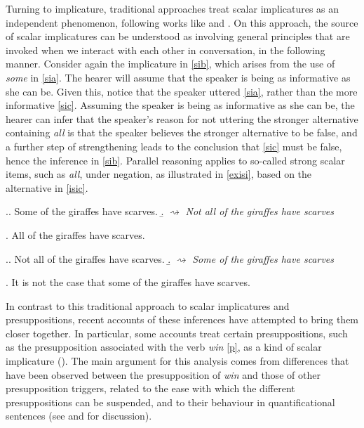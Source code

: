 \documentclass[12pt, letterpaper]{article}
\begin{document}
Turning to implicature, traditional approaches treat scalar implicatures as an independent phenomenon, following works like \cite{Grice:1975} and \cite*{Horn:1972}. On this approach, the source of scalar implicatures can be understood as involving general principles that are invoked when we interact with each other in conversation, in the following manner. Consider again the implicature in \ref{sib}, which arises from the use of \textit{some} in \ref{sia}. The hearer will assume that the speaker is being as informative as she can be. Given this, notice that the speaker uttered \ref{sia}, rather than the more informative \ref{sic}. Assuming the speaker is being as informative as she can be, the hearer can infer that the speaker's reason for not uttering the stronger alternative containing \textit{all} is that the speaker believes the stronger alternative to be false, and a further step of strengthening leads to the conclusion that \ref{sic} must be false, hence the inference in \ref{sib}. Parallel reasoning applies to so-called strong scalar items, such as \textit{all}, under negation, as illustrated in \ref{exisi}, based on the alternative in \ref{isic}.

\ex.\label{exsi}\a. \label{sia} Some of the giraffes have scarves.  
\b. \label{sib} $\rightsquigarrow$ \textit{Not all of the giraffes have scarves}

\ex. \label{sic} All of the giraffes have scarves.

\ex.\label{exisi}\a. \label{isia} Not all of the giraffes have scarves.  
\b. \label{isib} $\rightsquigarrow$ \textit{Some of the giraffes have scarves}

\ex. \label{isic} It is not the case that some of the giraffes have scarves.

In contrast to this traditional approach to scalar implicatures and presuppositions, recent accounts of these inferences have attempted to bring them closer together. In particular, some accounts treat certain presuppositions, such as the presupposition associated with the verb \textit{win} \ref{p}, as a kind of scalar implicature (\citealt{Simons:2001, Abusch:2002, Abusch:2009, Chemla:2009, Romoli:2012c, Romoli:2014}). The main argument for this analysis comes from differences that have been observed between the presupposition of \textit{win} and those of other presupposition triggers, related to the ease with which the different presuppositions can be suspended, and to their behaviour in quantificational sentences (see \citealt{Abusch:2009} and \citealt{Romoli:2014} for discussion). 
\end{document}
